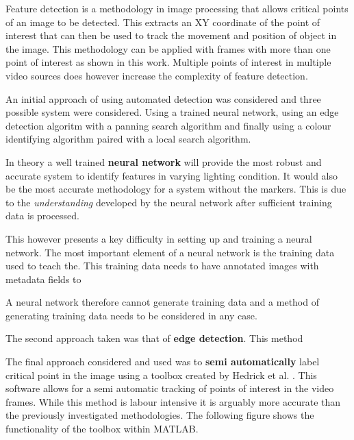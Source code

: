 Feature detection is a methodology in image processing that allows critical points of an image to be detected. This extracts an XY coordinate of the point of interest that can then be used to track the movement and position of object in the image. This methodology can be applied with frames with more than one point of interest as shown in this work. Multiple points of interest in multiple video sources does however increase the complexity of feature detection.

An initial approach of using automated detection was considered and three possible system were considered. Using a trained neural network, using an edge detection algoritm with a panning search algorithm and finally using a colour identifying algorithm paired with a local search algorithm.

In theory a well trained \textbf{neural network} will provide the most robust and accurate system to identify features in varying lighting condition. It would also be the most accurate methodology for a system without the markers. This is due to the \textit{understanding} developed by the neural network after sufficient training data is processed.

This however presents a key difficulty in setting up and training a neural network. The most important element of a neural network is the training data used to teach the. This training data needs to have annotated images with metadata fields to

A neural network therefore cannot generate training data and a method of generating training data needs to be considered in any case.

The second approach taken was that of \textbf{edge detection}. This method 

The final approach considered and used was to \textbf{semi automatically} label critical point in the image using a toolbox created by Hedrick et al. \cite{hedrick2008software}. This software allows for a semi automatic tracking of points of interest in the video frames. While this method is labour intensive it is arguably more accurate than the previously investigated methodologies. The following figure shows the functionality of the toolbox within MATLAB.

